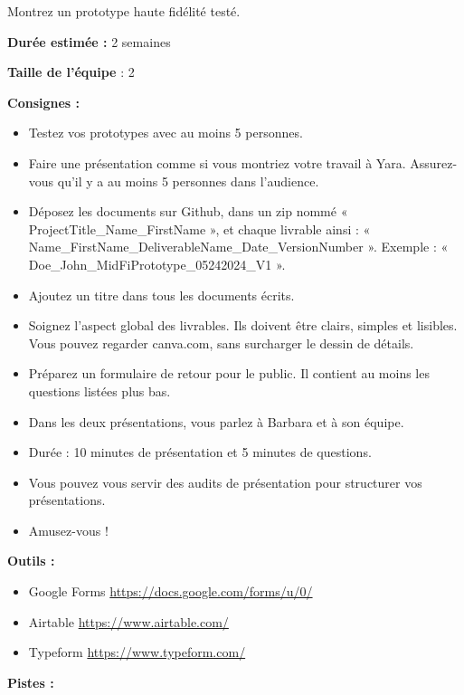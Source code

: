 \makeheaderfiles

Montrez un prototype haute fidélité testé.

\textbf{Durée estimée :} 2 semaines

\textbf{Taille de l'équipe} : 2

\textbf{Consignes :}

\begin{itemize}
\item Testez vos prototypes avec au moins 5 personnes.
\item Faire une présentation comme si vous montriez votre travail à Yara. Assurez-vous qu'il y a au moins 5 personnes dans l'audience.
\item Déposez les documents sur Github, dans un zip nommé « ProjectTitle\_Name\_FirstName », et chaque livrable ainsi : « Name\_FirstName\_DeliverableName\_Date\_VersionNumber ». Exemple : « Doe\_John\_MidFiPrototype\_05242024\_V1 ».
\item Ajoutez un titre dans tous les documents écrits.
\item Soignez l'aspect global des livrables. Ils doivent être clairs, simples et lisibles. Vous pouvez regarder canva.com, sans surcharger le dessin de détails.
\item Préparez un formulaire de retour pour le public. Il contient au moins les questions listées plus bas.
\item Dans les deux présentations, vous parlez à Barbara et à son équipe.
\item Durée : 10 minutes de présentation et 5 minutes de questions.
\item Vous pouvez vous servir des audits de présentation pour structurer vos présentations.
\item Amusez-vous !
\end{itemize}

\textbf{Outils :}

\begin{itemize}
\item Google Forms \url{https://docs.google.com/forms/u/0/}
\item Airtable \url{https://www.airtable.com/}
\item Typeform \url{https://www.typeform.com/}
\end{itemize}

\textbf{Pistes :}

